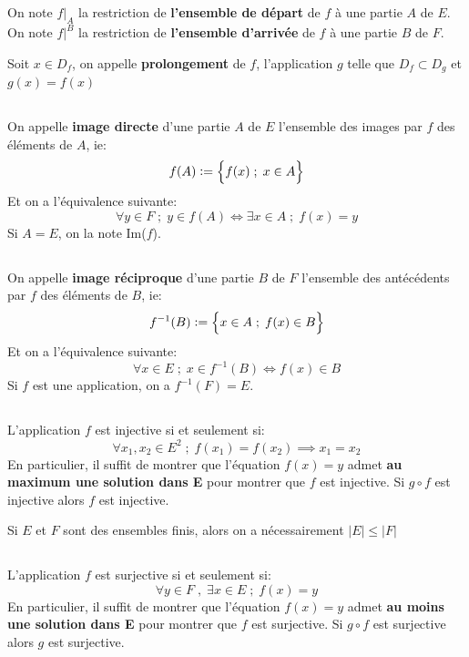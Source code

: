 \subsection*{}
On note \(f|_A\) la restriction de \textbf{l'ensemble de départ} de \(f\) à une partie \(A\) de \(E\).\+
On note \(f|^B\) la restriction de \textbf{l'ensemble d'arrivée} de \(f\) à une partie \(B\) de \(F\).\<

Soit \(x \in D_f\), on appelle \textbf{prolongement} de \(f\), l'application \(g\) telle que \(D_f \subset D_g\) et \(g(x) = f(x)\)
\subsection*{}
On appelle \textbf{image directe} d'une partie \(A\) de \(E\) l'ensemble des images par \(f\) des éléments de \(A\), ie:
\[
   f(A) := \Bigl\{ f(x) \; ; \; x \in A \Bigl\}   
\]
Et on a l'équivalence suivante:
\[
   \forall y \in F \; ; \; y \in f(A) \Longleftrightarrow \exists x \in A \; ; \; f(x) = y
\]
Si \(A = E\), on la note Im(\(f\)).
\subsection*{}
On appelle \textbf{image réciproque} d'une partie \(B\) de \(F\) l'ensemble des antécédents par \(f\) des éléments de \(B\), ie:
\[
   f^{-1}(B) := \Bigl\{ x \in A \; ; \; f(x) \in B \Bigl\}   
\]
Et on a l'équivalence suivante:
\[
   \forall x \in E \; ; \; x \in f^{-1}(B) \Longleftrightarrow f(x) \in B
\]
Si \(f\) est une application, on a \(f^{-1}(F) = E\). 
\subsection*{}
L'application \(f\) est injective si et seulement si:
\[
    \boxed{
        \forall x_1, x_2 \in E^2 \; ; \; f(x_1) = f(x_2) \implies x_1 = x_2 
    }
\]
En particulier, il suffit de montrer que l'équation \(f(x) = y\) admet \textbf{au maximum une solution dans E} pour montrer que \(f\) est injective.\+
Si \(g \circ f\) est injective alors \(f\) est injective.\<

Si \(E\) et \(F\) sont des ensembles finis, alors on a nécessairement \(|E| \leq |F|\)
\subsection*{}
L'application \(f\) est surjective si et seulement si:
\[
    \boxed{
        \forall y \in F \; , \; \exists x \in E \; ; \; f(x) = y  
    }
\]
En particulier, il suffit de montrer que l'équation \(f(x) = y\) admet \textbf{au moins une solution dans E} pour montrer que \(f\) est surjective.\+
Si \(g \circ f\) est surjective alors \(g\) est surjective.\<

